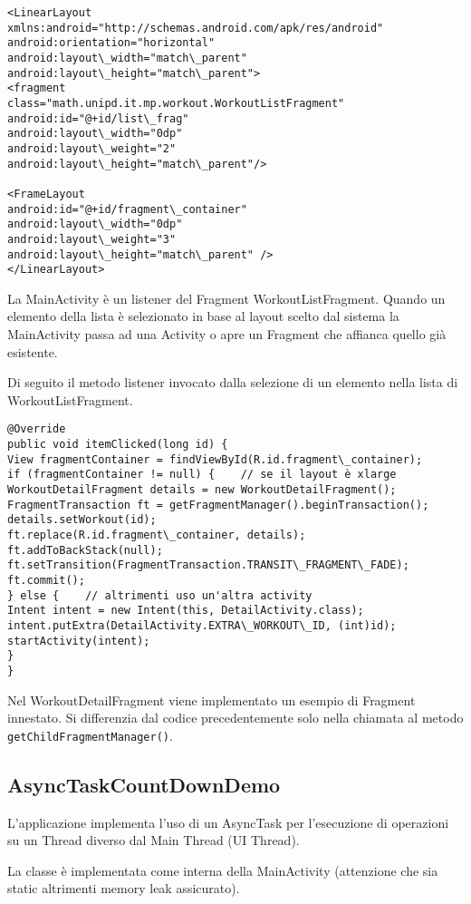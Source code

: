 \begin{lstlisting}
<LinearLayout xmlns:android="http://schemas.android.com/apk/res/android"
android:orientation="horizontal"
android:layout\_width="match\_parent"
android:layout\_height="match\_parent">
<fragment
class="math.unipd.it.mp.workout.WorkoutListFragment"
android:id="@+id/list\_frag"
android:layout\_width="0dp"
android:layout\_weight="2"
android:layout\_height="match\_parent"/>

<FrameLayout
android:id="@+id/fragment\_container"
android:layout\_width="0dp"
android:layout\_weight="3"
android:layout\_height="match\_parent" />
</LinearLayout>
\end{lstlisting}

La MainActivity è un listener del Fragment WorkoutListFragment. Quando un elemento della lista è selezionato in base al layout scelto dal sistema la MainActivity passa ad una Activity o apre un Fragment che affianca quello già esistente.

Di seguito il metodo listener invocato dalla selezione di un elemento nella lista di WorkoutListFragment.

\begin{lstlisting}
@Override
public void itemClicked(long id) {
View fragmentContainer = findViewById(R.id.fragment\_container);
if (fragmentContainer != null) {	// se il layout è xlarge 
WorkoutDetailFragment details = new WorkoutDetailFragment();
FragmentTransaction ft = getFragmentManager().beginTransaction();
details.setWorkout(id);
ft.replace(R.id.fragment\_container, details);
ft.addToBackStack(null);
ft.setTransition(FragmentTransaction.TRANSIT\_FRAGMENT\_FADE);
ft.commit();
} else {	// altrimenti uso un'altra activity
Intent intent = new Intent(this, DetailActivity.class);
intent.putExtra(DetailActivity.EXTRA\_WORKOUT\_ID, (int)id);
startActivity(intent);
}
}
\end{lstlisting}

Nel WorkoutDetailFragment viene implementato un esempio di Fragment innestato. Si differenzia dal codice precedentemente solo nella chiamata al metodo \lstinline|getChildFragmentManager()|.


\subsection{AsyncTaskCountDownDemo}
L'applicazione implementa l'uso di un AsyncTask per l'esecuzione di operazioni su un Thread diverso dal Main Thread (UI Thread).

La classe è implementata come interna della MainActivity (attenzione che sia static altrimenti memory leak assicurato).

